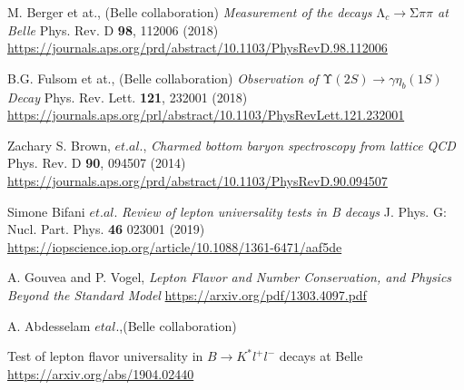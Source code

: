 \documentclass{article}
\begin{document}
\begin{thebibliography}{9}
M. Berger et at., (Belle collaboration)
\textit{Measurement of the decays ${\mathrm{\ensuremath{\Lambda}}}_{c}\ensuremath{\rightarrow}\mathrm{\ensuremath{\Sigma}}\ensuremath{\pi}\ensuremath{\pi}$ at Belle}
Phys. Rev. D \textbf{98}, 112006 (2018)
\url{https://journals.aps.org/prd/abstract/10.1103/PhysRevD.98.112006}


B.G. Fulsom et at., (Belle collaboration)
\textit{Observation of $\mathrm{\ensuremath{\Upsilon}}(2S)\ensuremath{\rightarrow}\ensuremath{\gamma}{\ensuremath{\eta}}_{b}(1S)$ Decay}
Phys. Rev. Lett. \textbf{121}, 232001 (2018)
\url{https://journals.aps.org/prl/abstract/10.1103/PhysRevLett.121.232001}

Zachary S. Brown, $et. al.$,
\textit{Charmed bottom baryon spectroscopy from lattice QCD}
Phys. Rev. D \textbf{90}, 094507 (2014)
\url{https://journals.aps.org/prd/abstract/10.1103/PhysRevD.90.094507}

Simone Bifani $et. al.$ 
\textit{Review of lepton universality tests in B decays}
J. Phys. G: Nucl. Part. Phys. \textbf{46} 023001 (2019)
\url{https://iopscience.iop.org/article/10.1088/1361-6471/aaf5de}

A. Gouvea and P. Vogel,
\textit{Lepton Flavor and Number Conservation, and Physics Beyond the Standard Model}
\url{https://arxiv.org/pdf/1303.4097.pdf}

A. Abdesselam $et al.$,(Belle collaboration)
\item{Test of lepton flavor universality in $B\rightarrow K^{*}l^{+}l^{-}$ decays at Belle}
\url{https://arxiv.org/abs/1904.02440}




\end{thebibliography}
\end{document}

